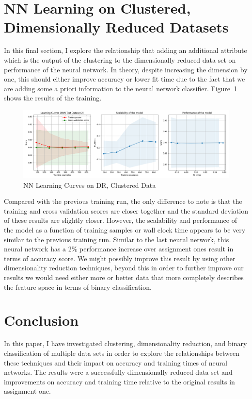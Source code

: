 \documentclass[11pt]{article}
\begin{document}
    \section{NN Learning on Clustered, Dimensionally Reduced Datasets}\label{sec:nn-learning-on-clustered,-dimensionally-reduced-datasets}
    In this final section, I explore the relationship that adding an additional attribute which is the output of the clustering to the dimensionally reduced data set on performance of the neural network.
    In theory, despite increasing the dimension by one, this should either improve accuracy or lower fit time due to the fact that we are adding some a priori information to the neural network classifier.
    Figure~\ref{Fig:NN Learning Curves on DR Clustered Data} shows the results of the training.
    \begin{figure}
        \centering
        \includegraphics[width=.9\linewidth]{ann2.png}
        \caption{NN Learning Curves on DR, Clustered Data}\label{Fig:NN Learning Curves on DR Clustered Data}
    \end{figure}
    Compared with the previous training run, the only difference to note is that the training and cross validation scores are closer together and the standard deviation of these results are slightly closer.
    However, the scalability and performance of the model as a function of training samples or wall clock time appears to be very similar to the previous training run.
    Similar to the last neural network, this neural network has a 2\% performance increase over assignment ones result in terms of accuracy score.
    We might possibly improve this result by using other dimensionality reduction techniques, beyond this in order to further improve our results we would need either more or better data that more completely describes the feature space in terms of binary classification.


    \section{Conclusion}\label{sec:conclusion}
    In this paper, I have investigated clustering, dimensionality reduction, and binary classification of multiple data sets in order to explore the relationships between these techniques and their impact on accuracy and training times of neural networks.
    The results were a successfully dimensionally reduced data set and improvements on accuracy and training time relative to the original results in assignment one.
    
    
\end{document}
